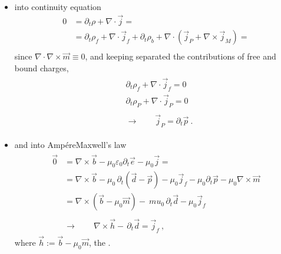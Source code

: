 \documentclass[letterpaper,10pt,english]{jupyterBook}
\begin{document}
\begin{itemize}
\item {} 
\sphinxAtStartPar
into continuity equation
\begin{equation*}
\begin{split}
    0 
    & = \partial_t \rho + \nabla \cdot \vec{j} = \\
    & = \partial_t \rho_f + \nabla \cdot \vec{j}_f + \partial_t \rho_b + \nabla \cdot ( \vec{j}_P + \nabla \times \vec{j}_M ) = \\
  \end{split}
\end{equation*}
\sphinxAtStartPar
since \(\nabla \cdot \nabla \times \vec{m} \equiv 0\), and keeping separated the contributions of free and bound charges,
\begin{equation*}
\begin{split}\begin{aligned}
     & \partial_t \rho_f + \nabla \cdot \vec{j}_f = 0 \\
     & \partial_t \rho_P + \nabla \cdot \vec{j}_P = 0 \\ \\
     & \rightarrow \qquad \vec{j}_P = \partial_t \vec{p} \ .
  \end{aligned}\end{split}
\end{equation*}
\item {} 
\sphinxAtStartPar
and into Ampére\sphinxhyphen{}Maxwell’s law
\begin{equation*}
\begin{split}\begin{aligned}
    \vec{0}
    & = \nabla \times \vec{b} - \mu_0 \varepsilon_0 \partial_t \vec{e} - \mu_0 \vec{j} = \\
    & = \nabla \times \vec{b} - \mu_0 \, \partial_t \left( \vec{d} - \vec{p} \right) - \mu_0 \vec{j}_f - \mu_0 \partial_t \vec{p} - \mu_0 \nabla \times \vec{m} \\
    & = \nabla \times \left( \vec{b} - \mu_0 \vec{m} \right) - \ mu_0 \, \partial_t \vec{d} - \mu_0 \vec{j}_f \\ \\ 
    & \rightarrow \qquad \nabla \times \vec{h}  - \, \partial_t \vec{d} = \vec{j}_f \ ,
  \end{aligned}\end{split}
\end{equation*}
\sphinxAtStartPar
where \(\vec{h} := \vec{b} - \mu_0 \vec{m}\), the .

\end{itemize}
\end{document}
